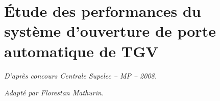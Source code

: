 \documentclass[10pt]{article}
\newif\ifprof
\begin{document}






\begin{comp}
\noindent %
%
%
\end{comp}

\section*{Étude des performances du système d'ouverture de porte automatique de TGV }

\begin{flushright}
\textit{D'après concours Centrale Supelec -- MP -- 2008.}

\textit{Adapté par Florestan Mathurin.}
\end{flushright}

\ifprof
\else
\end{document}
